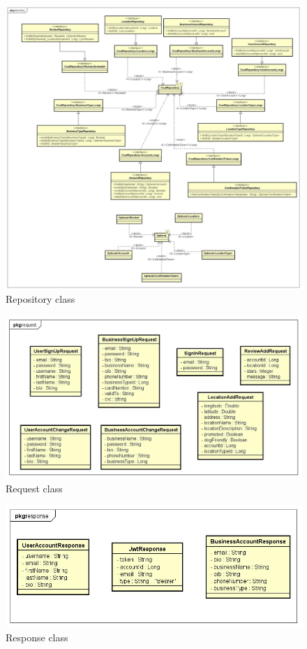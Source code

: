         \begin{figure}[H]
        	\includegraphics[width=\textwidth]{img/Dijagrami razreda/Repository_Class_Dijagram.jpg}
        	\centering
        	\caption{Repository class}
        	\label{fig:promjene}
        \end{figure}
        \begin{figure}[H]
        	\includegraphics[width=\textwidth]{img/Dijagrami razreda/Request_Class_Dijagram.jpg}
        	\centering
        	\caption{Request class}
        	\label{fig:promjene}
        \end{figure}
        \begin{figure}[H]
        	\includegraphics[width=\textwidth]{img/Dijagrami razreda/Response_Class_Dijagram.jpg}
        	\centering
        	\caption{Response class}
        	\label{fig:promjene}
        \end{figure}
